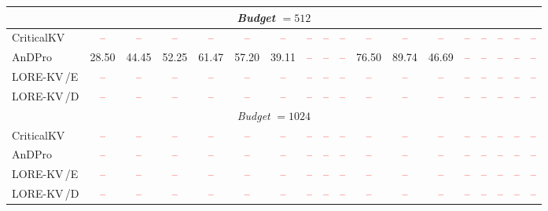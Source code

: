 \documentclass{article} %
\newcommand{\tbd}{\textcolor{red}{--}}
\newcommand{\lorekvE}{LORE-KV\,/E}
\newcommand{\lorekvD}{LORE-KV\,/D}
\begin{document}
\begin{table}[t]
{\begin{tabular}{lccccccccccccccccc}
\midrule
\multicolumn{18}{c}{\textit{Budget} $=512$} \\
\midrule
CriticalKV & \tbd & \tbd & \tbd & \tbd & \tbd & \tbd & \tbd & \tbd & \tbd & \tbd & \tbd & \tbd & \tbd & \tbd & \tbd & \tbd & \tbd \\
AnDPro & 28.50 & 44.45 & 52.25 & 61.47 & 57.20 & 39.11 & \tbd & \tbd & \tbd & 76.50 & 89.74 & 46.69 & \tbd & \tbd & \tbd & \tbd & \tbd \\
\lorekvE & \tbd & \tbd & \tbd & \tbd & \tbd & \tbd & \tbd & \tbd & \tbd & \tbd & \tbd & \tbd & \tbd & \tbd & \tbd & \tbd & \tbd \\
\lorekvD & \tbd & \tbd & \tbd & \tbd & \tbd & \tbd & \tbd & \tbd & \tbd & \tbd & \tbd & \tbd & \tbd & \tbd & \tbd & \tbd & \tbd \\

\midrule
\multicolumn{18}{c}{\textit{Budget} $=1024$} \\
\midrule
CriticalKV & \tbd & \tbd & \tbd & \tbd & \tbd & \tbd & \tbd & \tbd & \tbd & \tbd & \tbd & \tbd & \tbd & \tbd & \tbd & \tbd & \tbd \\
AnDPro & \tbd & \tbd & \tbd & \tbd & \tbd & \tbd & \tbd & \tbd & \tbd & \tbd & \tbd & \tbd & \tbd & \tbd & \tbd & \tbd & \tbd \\
\lorekvE & \tbd & \tbd & \tbd & \tbd & \tbd & \tbd & \tbd & \tbd & \tbd & \tbd & \tbd & \tbd & \tbd & \tbd & \tbd & \tbd & \tbd \\
\lorekvD & \tbd & \tbd & \tbd & \tbd & \tbd & \tbd & \tbd & \tbd & \tbd & \tbd & \tbd & \tbd & \tbd & \tbd & \tbd & \tbd & \tbd \\
\bottomrule
\end{tabular}}
\end{table}
\end{document}
